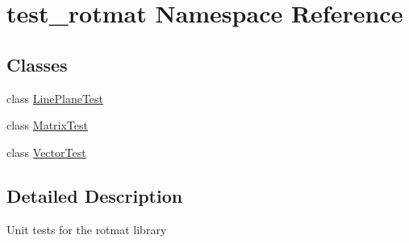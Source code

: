\hypertarget{namespacetest__rotmat}{}\section{test\+\_\+rotmat Namespace Reference}
\label{namespacetest__rotmat}
\subsection*{Classes}
\begin{DoxyCompactItemize}
\item 
class \mbox{\hyperlink{classtest__rotmat_1_1LinePlaneTest}{Line\+Plane\+Test}}
\item 
class \mbox{\hyperlink{classtest__rotmat_1_1MatrixTest}{Matrix\+Test}}
\item 
class \mbox{\hyperlink{classtest__rotmat_1_1VectorTest}{Vector\+Test}}
\end{DoxyCompactItemize}


\subsection{Detailed Description}
\begin{DoxyVerb}Unit tests for the rotmat library
\end{DoxyVerb}
 